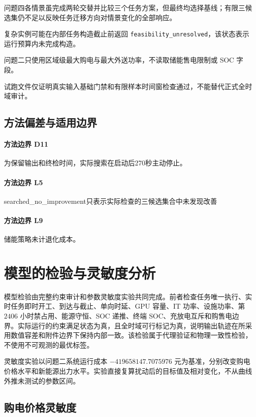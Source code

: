 \documentclass[withoutpreface,bwprint]{cumcmthesis}
\begin{document}
问题四各情景虽完成两轮交替并比较三个任务方案，但最终均选择基线；有限三候选集仍不足以反映任务迁移方向对情景变化的全部响应。

复杂实例可能在内部任务构造截止前返回 \texttt{feasibility\_unresolved}，该状态表示运行预算内未完成构造。

问题二只使用区域级最大购电与最大外送功率，不读取储能售电限制或 SOC 字段。

试跑文件仅证明真实输入基础门禁和有限样本时间窗检查通过，不能替代正式全时域审计。


\subsection{方法偏差与适用边界}
\paragraph{方法边界 D11}为保留输出和终检时间，实际搜索在启动后270秒主动停止。

\paragraph{方法边界 L5}searched\_no\_improvement只表示实际检查的三候选集合中未发现改善

\paragraph{方法边界 L9}储能策略未计退化成本。

\section{模型的检验与灵敏度分析}

模型检验由完整约束审计和参数灵敏度实验共同完成。前者检查任务唯一执行、实时任务即时开工、到达与截止、单向时延、GPU 容量、IT 功率、设施功率、第 $2406$ 小时禁占用、能源守恒、SOC 递推、终端 SOC、充放电互斥和购售电边界。实际运行的约束满足状态为真，且全时域可行标记为真，说明输出轨迹在所采用数值容差和附件边界下保持内部一致。该检验属于代理验证和物理一致性检验，不使用不可观测的最优标签。

灵敏度实验以问题二系统运行成本 $-419658147.7075976$ 元为基准，分别改变购电价格水平和新能源出力水平。实验直接复算扰动后的目标值及相对变化，不从曲线外推未测试的参数区间。

\subsection{购电价格灵敏度}
\end{document}
